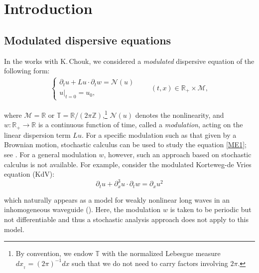 \documentclass[letterpaper, 11pt,  reqno]{amsart}
\newcommand{\1}{\hspace{0.5mm}\text{I}\hspace{0.5mm}}
\newcommand{\noi}{\noindent}
\newcommand{\Z}{\mathbb{Z}}
\newcommand{\R}{\mathbb{R}}
\newcommand{\T}{\mathbb{T}}
\newcommand{\dx}{\partial_x}
\newcommand{\dt}{\partial_t}
\newcommand{\M}{\mathcal{M}}
\newcommand{\NN}{\mathcal{N}}
\numberwithin{equation}{section}
\numberwithin{theorem}{section}
\begin{document}
%
\maketitle
%


\tableofcontents

















\section{Introduction}\label{SEC:1}

\subsection{Modulated dispersive equations}
\label{SUBSEC:1.1}


In the works \cite{CG1, CGLLO1}
 with K.\,Chouk, we  
 considered a {\it modulated} dispersive equation of the following form:
 \begin{align}
\begin{cases}
\dt u +  L u \cdot \dt w=  \NN(u)  \\ 
u|_{t = 0} = u_0,
\end{cases}
\qquad ( t, x) \in \R_+ \times \M,
\label{ME1}
\end{align}


\noi
where $\M  = \R$ or $\T = \R/ (2\pi \Z)$,\footnote{By convention, we endow
$\T$ with the normalized Lebesgue measure $ dx_{_\T} =  (2\pi)^{-1}dx$
such that we do not need to carry factors involving $2\pi$.}
$\NN(u)$ denotes the nonlinearity, 
and 
 $w:\R_+\to\R$ is a continuous function of time, 
called a {\it modulation}, 
 acting on the linear dispersion term $Lu$.
For a specific modulation such as that given by a Brownian motion, 
stochastic calculus can be used to study 
the equation \eqref{ME1};  see \cite{DD, DT, DR2, Ste}.
For a general modulation $w$, however, 
such an approach based on stochastic calculus
is not available.
For example, 
consider 
the modulated 
 Korteweg-de Vries equation (KdV):
\begin{equation}
\label{kdv1}
\dt u+  \dx^3 u \cdot \dt w =\dx u^2
\end{equation}


\noi
which 
naturally appears 
as a model 
for
weakly nonlinear long waves in an inhomogeneous waveguide
(\cite{CMG, HZ}).
Here, 
the modulation $w$ is taken to be periodic but not differentiable
and thus 
a stochastic analysis approach does not apply to this model.
\end{document}
